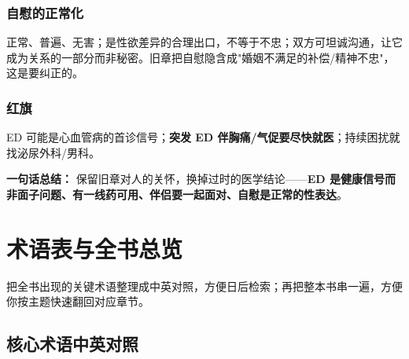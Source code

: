 \subsection*{自慰的正常化}
正常、普遍、无害；是性欲差异的合理出口，不等于不忠；双方可坦诚沟通，让它成为关系的一部分而非秘密。旧章把自慰隐含成"婚姻不满足的补偿/精神不忠"，这是要纠正的。

\subsection*{红旗}
ED 可能是心血管病的首诊信号；\textbf{突发 ED 伴胸痛/气促要尽快就医}；持续困扰就找泌尿外科/男科。

\vspace{1em}
\noindent\textbf{一句话总结：} 保留旧章对人的关怀，换掉过时的医学结论——\textbf{ED 是健康信号而非面子问题、有一线药可用、伴侣要一起面对、自慰是正常的性表达}。

\chapter{术语表与全书总览}
\label{chap:glossary}

把全书出现的关键术语整理成中英对照，方便日后检索；再把整本书串一遍，方便你按主题快速翻回对应章节。

\section{核心术语中英对照}

